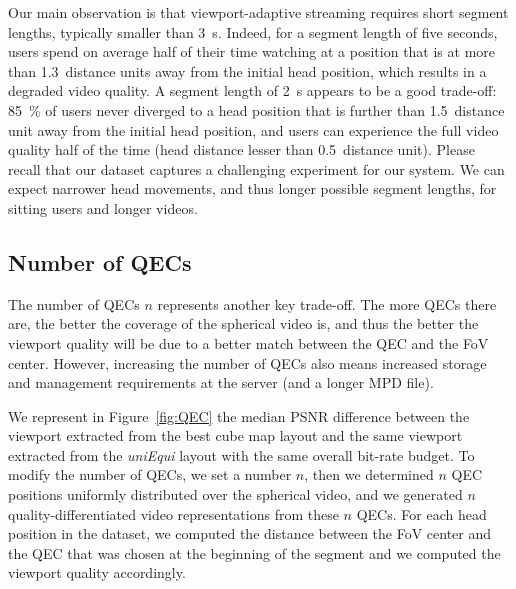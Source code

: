 Our main observation is that viewport-adaptive streaming requires
short segment lengths, typically smaller than \SI{3}{\second}. Indeed,
for a segment length of five seconds, users spend on average half of
their time watching at a position that is at more than
\num{1.3}~distance units away from the initial head position, which
results in a degraded video quality. A segment length of
\SI{2}{\second} appears to be a good trade-off: \SI{85}{\percent} of
users never diverged to a head position that is further than
\num{1.5}~distance unit away from the initial head position, and users
can experience the full video quality half of the time (head distance
lesser than \num{0.5}~distance unit). Please recall that our dataset
captures a challenging experiment for our system. We can expect
narrower head movements, and thus longer possible segment lengths, for
sitting users and longer videos.


\subsection{Number of \acp{QEC}}

The number of \acp{QEC} $n$ represents another key trade-off. The more
\acp{QEC} there are, the better the coverage of the spherical video
is, and thus the better the viewport quality will be due to a better
match between the \ac{QEC} and the \ac{FoV} center. However,
increasing the number of \acp{QEC} also means increased storage and
management requirements at the server (and a longer \ac{MPD} file).

We represent in Figure~\ref{fig:QEC} the median \ac{PSNR} difference
between the viewport extracted from the best cube map layout and the
same viewport extracted from the \emph{uniEqui} layout with the same
overall bit-rate budget. To modify the number of \acp{QEC}, we set a
number $n$, then we determined $n$ \ac{QEC} positions uniformly
distributed over the spherical video, and we generated $n$
quality-differentiated video representations from these $n$ \acp{QEC}.
For each head position in the dataset, we computed the distance
between the \ac{FoV} center and the \ac{QEC} that was chosen at the
beginning of the segment and we computed the viewport quality
accordingly.
%
%



